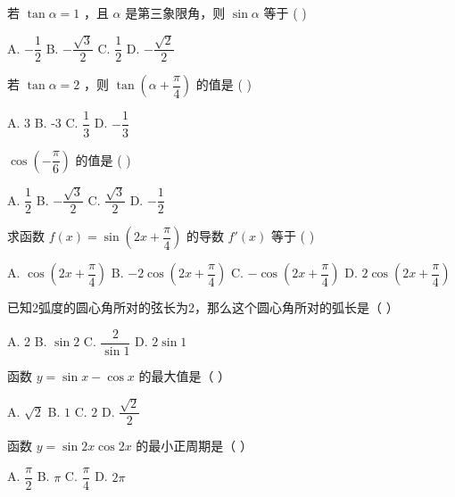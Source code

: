 \documentclass[11pt, a4paper]{article}
\begin{document}
\begin{baitap}[2]
若 $\tan\alpha = 1$ ，且 $\alpha$ 是第三象限角，则 $\sin\alpha$ 等于 ( )
\par\vspace{3pt}
\noindent A. $-\dfrac{1}{2}$ \quad B. $-\dfrac{\sqrt{3}}{2}$ \quad C. $\dfrac{1}{2}$ \quad D. $-\dfrac{\sqrt{2}}{2}$
\end{baitap}

\begin{baitap}[3]
若 $\tan\alpha = 2$ ，则 $\tan\!\left(\alpha + \dfrac{\pi}{4}\right)$ 的值是 ( )
\par\vspace{3pt}
\noindent A. 3 \quad B. -3 \quad C. $\dfrac{1}{3}$ \quad D. $-\dfrac{1}{3}$
\end{baitap}

\begin{baitap}[4]
$\cos\!\left(-\dfrac{\pi}{6}\right)$ 的值是 ( )
\par\vspace{3pt}
\noindent A. $\dfrac{1}{2}$ \quad B. $-\dfrac{\sqrt{3}}{2}$ \quad C. $\dfrac{\sqrt{3}}{2}$ \quad D. $-\dfrac{1}{2}$
\end{baitap}

\begin{baitap}[5]
求函数 $f(x) = \sin\!\left(2x + \dfrac{\pi}{4}\right)$ 的导数 $f'(x)$ 等于 ( )
\par\vspace{3pt}
\noindent A. $\cos\!\left(2x + \dfrac{\pi}{4}\right)$ \quad B. $-2\cos\!\left(2x + \dfrac{\pi}{4}\right)$ \quad C. $-\cos\!\left(2x + \dfrac{\pi}{4}\right)$ \quad D. $2\cos\!\left(2x + \dfrac{\pi}{4}\right)$
\end{baitap}

\begin{baitap}[6]
已知2弧度的圆心角所对的弦长为2，那么这个圆心角所对的弧长是（ ）
\par\vspace{3pt}
\noindent A. 2 \quad B. $\sin 2$ \quad C. $\dfrac{2}{\sin 1}$ \quad D. $2\sin 1$
\end{baitap}

\begin{baitap}[7]
函数 $y = \sin x - \cos x$ 的最大值是（ ）
\par\vspace{3pt}
\noindent A. $\sqrt{2}$ \quad B. $1$ \quad C. $2$ \quad D. $\dfrac{\sqrt{2}}{2}$
\end{baitap}

\begin{baitap}[8]
函数 $y = \sin 2x \cos 2x$ 的最小正周期是（ ）
\par\vspace{3pt}
\noindent A. $\dfrac{\pi}{2}$ \quad B. $\pi$ \quad C. $\dfrac{\pi}{4}$ \quad D. $2\pi$
\end{baitap}
\end{document}
